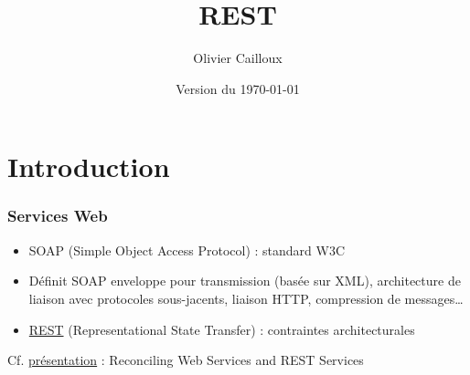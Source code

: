 \documentclass[english, french]{beamer}
\title{REST}
\subtitle{}
\author{Olivier Cailloux}
\institute[LAMSADE]{LAMSADE, Université Paris-Dauphine}
\date{Version du \today}
\begin{document}


\begin{frame}[plain]
   \titlepage
\end{frame}
\addtocounter{framenumber}{-1}

\section{Introduction}
\begin{frame}
	\frametitle{Services Web}
	\begin{itemize}
		\item SOAP (Simple Object Access Protocol) : standard W3C
		\item Définit SOAP enveloppe pour transmission (basée sur XML), architecture de liaison avec protocoles sous-jacents, liaison HTTP, compression de messages…
		\item \href{https://en.wikipedia.org/wiki/Representational_state_transfer}{REST} (Representational State Transfer) : contraintes architecturales
	\end{itemize}
	Cf. \href{http://www.w3.org/2005/Talks/1115-hh-k-ecows/}{présentation} : Reconciling Web Services and REST Services
\end{frame}
\end{document}
